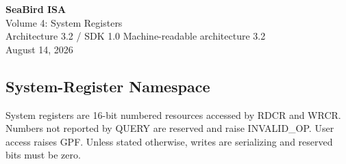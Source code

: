 \documentclass[11pt]{article}
\begin{document}
\begin{titlepage}\centering\vspace*{2cm}
{\Huge\bfseries SeaBird ISA\\[0.3cm]}{\LARGE Volume 4: System Registers\\[0.5cm]}
{\Large Architecture 3.2 / SDK 1.0}\vfill
{\large Machine-readable architecture 3.2\\August 14, 2026}\vfill
\end{titlepage}
\tableofcontents\clearpage
\subsection{System-Register Namespace}

System registers are 16-bit numbered resources accessed by RDCR and WRCR. Numbers not reported by QUERY are reserved and raise INVALID\_OP. User access raises GPF. Unless stated otherwise, writes are serializing and reserved bits must be zero.
\end{document}
